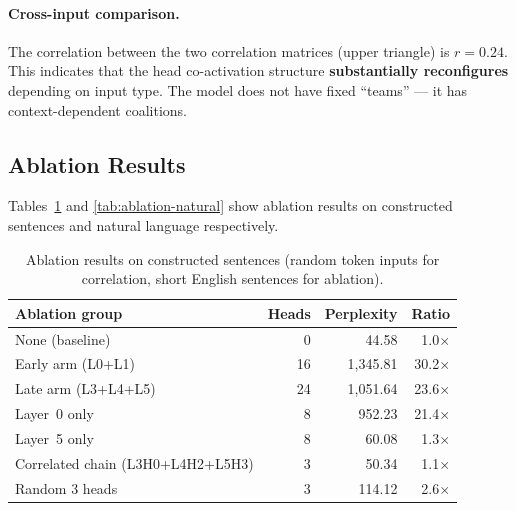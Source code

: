 \documentclass[11pt,a4paper]{article}
\begin{document}
\paragraph{Cross-input comparison.}
The correlation between the two correlation matrices (upper triangle) is $r = 0.24$.
This indicates that the head co-activation structure \textbf{substantially reconfigures} depending on input type.
The model does not have fixed ``teams'' --- it has context-dependent coalitions.

\subsection{Ablation Results}
\label{sec:ablation-results}

Tables~\ref{tab:ablation-random} and \ref{tab:ablation-natural} show ablation results on constructed sentences and natural language respectively.

\begin{table}[h]
\centering
\begin{tabular}{lrrr}
\toprule
Ablation group & Heads & Perplexity & Ratio \\
\midrule
None (baseline) & 0 & 44.58 & 1.0$\times$ \\
Early arm (L0+L1) & 16 & 1{,}345.81 & 30.2$\times$ \\
Late arm (L3+L4+L5) & 24 & 1{,}051.64 & 23.6$\times$ \\
Layer~0 only & 8 & 952.23 & 21.4$\times$ \\
Layer~5 only & 8 & 60.08 & 1.3$\times$ \\
Correlated chain (L3H0+L4H2+L5H3) & 3 & 50.34 & 1.1$\times$ \\
Random 3 heads & 3 & 114.12 & 2.6$\times$ \\
\bottomrule
\end{tabular}
\caption{Ablation results on constructed sentences (random token inputs for correlation, short English sentences for ablation).}
\label{tab:ablation-random}
\end{table}
\end{document}
